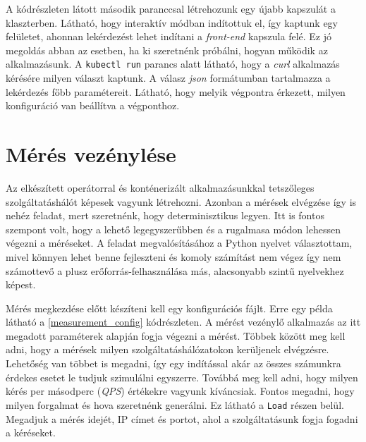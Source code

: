 A kódrészleten látott második paranccsal létrehozunk egy újabb kapszulát a klaszterben. Látható, hogy interaktív módban indítottuk el, így kaptunk egy felületet, ahonnan lekérdezést lehet indítani a \textit{front-end} kapszula felé. Ez jó megoldás abban az esetben, ha ki szeretnénk próbálni, hogyan működik az alkalmazásunk. A \verb+kubectl run+ parancs alatt látható, hogy a \textit{curl} alkalmazás kérésére milyen választ kaptunk. A válasz \textit{json} formátumban tartalmazza a lekérdezés főbb paramétereit. Látható, hogy melyik végpontra érkezett, milyen konfiguráció van beállítva a végponthoz.



\section{Mérés vezénylése}
\label{sec:measure_orchestrate}
Az elkészített operátorral és konténerizált alkalmazásunkkal tetszőleges szolgáltatáshálót képesek vagyunk létrehozni.
Azonban a mérések elvégzése így is nehéz feladat, mert szeretnénk, hogy determinisztikus legyen. Itt is fontos szempont volt, hogy a lehető legegyszerűbben és a rugalmasa módon lehessen végezni a méréseket. 
A feladat megvalósításához a Python nyelvet választottam, mivel könnyen lehet benne fejleszteni és komoly számítást nem végez így nem számottevő a plusz erőforrás-felhasználása más, alacsonyabb szintű nyelvekhez képest. 

Mérés megkezdése előtt készíteni kell egy konfigurációs fájlt. Erre egy példa látható a \ref{measurement_config} kódrészleten. A mérést vezénylő alkalmazás az itt megadott paraméterek alapján fogja végezni a mérést. Többek között meg kell adni, hogy a mérések milyen szolgáltatáshálózatokon kerüljenek elvégzésre. Lehetőség van többet is megadni, így egy indítással akár az összes számunkra érdekes esetet le tudjuk szimulálni egyszerre. Továbbá meg kell adni, hogy milyen kérés per másodperc (\textit{QPS}) értékekre vagyunk kíváncsiak. Fontos megadni, hogy milyen forgalmat és hova szeretnénk generálni. Ez látható a \verb+Load+ részen belül. Megadjuk a mérés idejét, IP címet és portot, ahol a szolgáltatásunk fogja fogadni a kéréseket.\\


\lstset{caption=Mérés konfigurációja, label=measurement_config}


